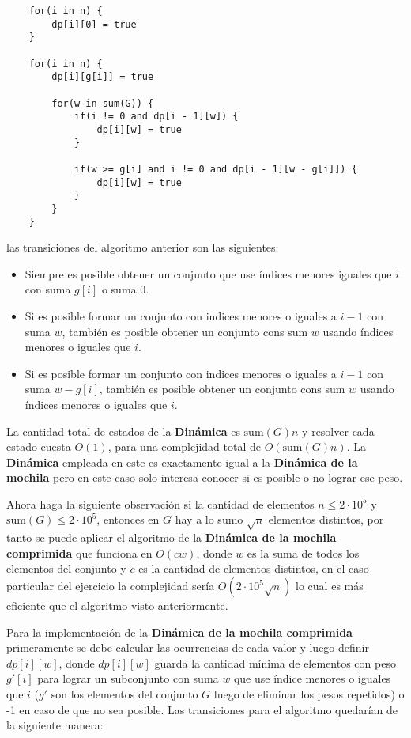 \documentclass{article}
\begin{document}
\begin{verbatim}
    for(i in n) {
        dp[i][0] = true
    }

    for(i in n) { 
        dp[i][g[i]] = true

        for(w in sum(G)) {
            if(i != 0 and dp[i - 1][w]) {
                dp[i][w] = true
            }
    
            if(w >= g[i] and i != 0 and dp[i - 1][w - g[i]]) {
                dp[i][w] = true
            }
        }
    }
\end{verbatim}

las transiciones del algoritmo anterior son las siguientes:

\begin{itemize}
    \item Siempre es posible obtener un conjunto que use índices menores iguales que $i$ con suma $g[i]$ o suma 0.
    \item Si es posible formar un conjunto con indices menores o iguales a $i - 1$ con suma $w$, también es posible
          obtener un conjunto cons sum $w$ usando índices menores o iguales que $i$.
    \item Si es posible formar un conjunto con indices menores o iguales a $i - 1$ con suma $w - g[i]$, también es posible
          obtener un conjunto cons sum $w$ usando índices menores o iguales que $i$.
\end{itemize}
La cantidad total de estados de la \textbf{Dinámica} es $\text{sum}(G)n$ y resolver cada estado cuesta $O(1)$, para
una complejidad total de $O(\text{sum}(G)n)$. La \textbf{Dinámica} empleada en este
es exactamente igual a la \textbf{Dinámica de la mochila} pero en este caso solo interesa conocer si es posible o no lograr ese peso.

Ahora haga la siguiente observación si la cantidad de elementos $n\leq 2\cdot 10^5$ y $\text{sum}(G) \leq 2\cdot 10^5$, entonces en $G$ hay a lo sumo $\sqrt{n}$ elementos distintos,
por tanto se puede aplicar el algoritmo de la \textbf{Dinámica de la mochila comprimida} que funciona en $O(cw)$, donde $w$ es la suma de
todos los elementos del conjunto y $c$ es la cantidad de elementos distintos, en el caso particular del ejercicio la complejidad sería $O(2\cdot 10^5\sqrt{n})$
lo cual es más eficiente que el algoritmo visto anteriormente.

Para la implementación de la \textbf{Dinámica de la mochila comprimida} primeramente se debe calcular las ocurrencias de cada valor y luego
definir $dp[i][w]$, donde $dp[i][w]$ guarda la cantidad mínima de elementos con peso $g'[i]$ para lograr un subconjunto con suma $w$ que use
índice menores o iguales que $i$ ($g'$ son los elementos del conjunto $G$ luego de eliminar los pesos repetidos) o -1 en caso de que no sea posible.
Las transiciones para el algoritmo quedarían de la siguiente manera:
\end{document}
